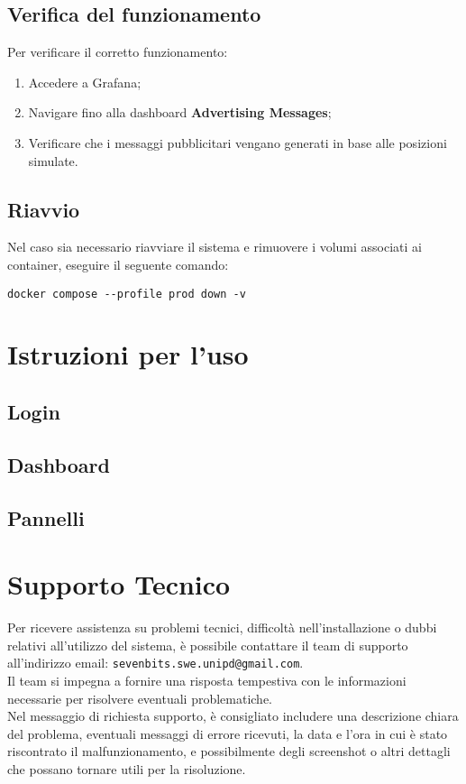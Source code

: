 \documentclass[10pt]{article}
\begin{document}
\begin{justify}
\subsection{Verifica del funzionamento}
Per verificare il corretto funzionamento:
\begin{enumerate}
    \item Accedere a Grafana;
    \item Navigare fino alla dashboard \textbf{Advertising Messages};
    \item Verificare che i messaggi pubblicitari vengano generati in base alle posizioni simulate.
\end{enumerate}

\subsection{Riavvio}
Nel caso sia necessario riavviare il sistema e rimuovere i volumi associati ai container, eseguire il seguente comando:
\begin{verbatim}
docker compose --profile prod down -v
\end{verbatim}



\section{Istruzioni per l'uso} %
\label{sec:istruzioni}

\subsection{Login}

\subsection{Dashboard}

\subsection{Pannelli}




\section{Supporto Tecnico}
\label{sec:supporto}
Per ricevere assistenza su problemi tecnici, difficoltà nell'installazione o dubbi relativi all'utilizzo del sistema, è possibile contattare il team di supporto all'indirizzo email: \texttt{sevenbits.swe.unipd@gmail.com}.\\
Il team si impegna a fornire una risposta tempestiva con le informazioni necessarie per risolvere eventuali problematiche.\\
Nel messaggio di richiesta supporto, è consigliato includere una descrizione chiara del problema, eventuali messaggi di errore ricevuti, la data e l'ora in cui è stato riscontrato il malfunzionamento, e possibilmente degli screenshot o altri dettagli che possano tornare utili per la risoluzione.




\end{justify}
\end{document}
